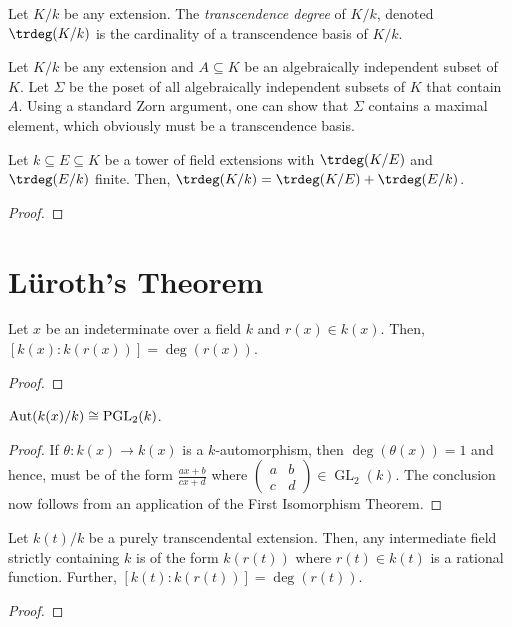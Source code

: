 \begin{definition}
    Let $K/k$ be any extension. The \emph{transcendence degree} of $K/k$, denoted $\trdeg(K/k)$ is the cardinality of a transcendence basis of $K/k$.
\end{definition}

\begin{remark}
    Let $K/k$ be any extension and $A\subseteq K$ be an algebraically independent subset of $K$. Let $\Sigma$ be the poset of all algebraically independent subsets of $K$ that contain $A$. Using a standard Zorn argument, one can show that $\Sigma$ contains a maximal element, which obviously must be a transcendence basis.
\end{remark}

\begin{theorem}
    Let $k\subseteq E\subseteq K$ be a tower of field extensions with $\trdeg(K/E)$ and $\trdeg(E/k)$ finite. Then, $\trdeg(K/k) = \trdeg(K/E) + \trdeg(E/k)$.
\end{theorem}
\begin{proof}
\end{proof}

\section{L\"uroth's Theorem}

\begin{lemma}
    Let $x$ be an indeterminate over a field $k$ and $r(x)\in k(x)$. Then, $[k(x):k(r(x))] = \deg(r(x))$.
\end{lemma}
\begin{proof}
\end{proof}

\begin{theorem}
    $\operatorname{Aut}(k(x)/k)\cong\operatorname{PGL}_2(k)$.
\end{theorem}
\begin{proof}
    If $\theta: k(x)\to k(x)$ is a $k$-automorphism, then $\deg(\theta(x)) = 1$ and hence, must be of the form $\frac{ax + b}{cx + d}$ where $\begin{pmatrix}a & b\\c & d\end{pmatrix}\in\operatorname{GL}_2(k)$. The conclusion now follows from an application of the First Isomorphism Theorem.
\end{proof}

\begin{theorem}
    Let $k(t)/k$ be a purely transcendental extension. Then, any intermediate field strictly containing $k$ is of the form $k(r(t))$ where $r(t)\in k(t)$ is a rational function. Further, $[k(t):k(r(t))] = \deg(r(t))$.
\end{theorem}
\begin{proof}
    
\end{proof}

